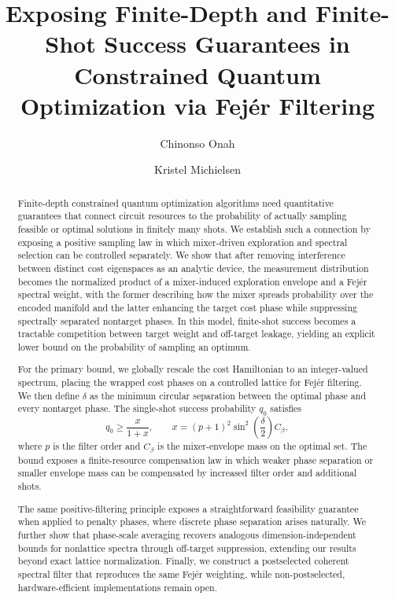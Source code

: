 \documentclass[a4paper,unpublished,onecolumn,11pt]{quantumarticle}
\author{Chinonso Onah}
\affiliation{Volkswagen AG, Berliner Ring 2, 38440 Wolfsburg, Germany}
\affiliation{Department of Physics, RWTH Aachen University, 52056 Aachen, Germany}
\author{Kristel Michielsen}
\affiliation{Forschungszentrum Jülich, D-52425 Jülich, Germany}
\affiliation{Universit\"at zu K\"oln, 50923 K\"oln, Germany}
\title{Exposing Finite-Depth and Finite-Shot Success Guarantees in Constrained Quantum Optimization via Fej\'er Filtering}
\theoremstyle{definition}
\theoremstyle{remark}
\begin{document}
\maketitle




\begin{abstract}
Finite-depth constrained quantum optimization algorithms need quantitative guarantees that connect circuit resources to the probability of actually sampling feasible or optimal solutions in finitely many shots. We establish such a connection by exposing a positive sampling law in which mixer-driven exploration and spectral selection can be controlled separately. We show that after removing interference between distinct cost eigenspaces as an analytic device, the measurement distribution becomes the normalized product of a mixer-induced exploration envelope and a Fej\'er spectral weight, with the former describing how the mixer spreads probability over the encoded manifold and the latter enhancing the target cost phase while suppressing spectrally separated nontarget phases. In this model, finite-shot success becomes a tractable competition between target weight and off-target leakage, yielding an explicit lower bound on the probability of sampling an optimum.

For the primary bound, we globally rescale the cost Hamiltonian to an integer-valued spectrum, placing the wrapped cost phases on a controlled lattice for Fej\'er filtering. We then define $\delta$ as the minimum circular separation between the optimal phase and every nontarget phase. The single-shot success probability $q_0$ satisfies
\[
q_0
\ge
\frac{x}{1+x},
\qquad
x
=
(p+1)^2
\sin^2\!\left(\frac{\delta}{2}\right)
C_{\beta},
\]
where $p$ is the filter order and $C_{\beta}$ is the mixer-envelope mass on the optimal set. The bound exposes a finite-resource compensation law in which weaker phase separation or smaller envelope mass can be compensated by increased filter order and additional shots.

The same positive-filtering principle exposes a straightforward feasibility guarantee when applied to penalty phases, where discrete phase separation arises naturally. We further show that phase-scale averaging recovers analogous dimension-independent bounds for nonlattice spectra through off-target suppression, extending our results beyond exact lattice normalization. Finally, we construct a postselected coherent spectral filter that reproduces the same Fej\'er weighting, while non-postselected, hardware-efficient implementations remain open.
\end{abstract}
\end{document}
